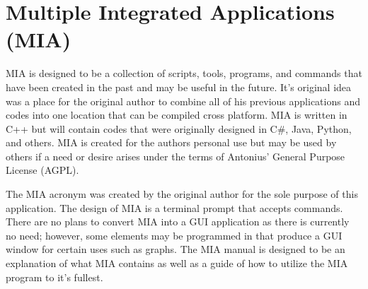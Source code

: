 \chapter{Multiple Integrated Applications (MIA)}
\pagestyle{fancy}

MIA is designed to be a collection of scripts, tools, programs, and commands that have been created in the past and may be useful in the future. It's original idea was a place for the original author to combine all of his previous applications and codes into one location that can be compiled cross platform. MIA is written in C++ but will contain codes that were originally designed in C\#, Java, Python, and others. MIA is created for the authors personal use but may be used by others if a need or desire arises under the terms of Antonius’ General Purpose License (AGPL). 

The MIA acronym was created by the original author for the sole purpose of this application. The design of MIA is a terminal prompt that accepts commands. There are no plans to convert MIA into a GUI application as there is currently no need; however, some elements may be programmed in that produce a GUI window for certain uses such as graphs. The MIA manual is designed to be an explanation of what MIA contains as well as a guide of how to utilize the MIA program to it's fullest. 
